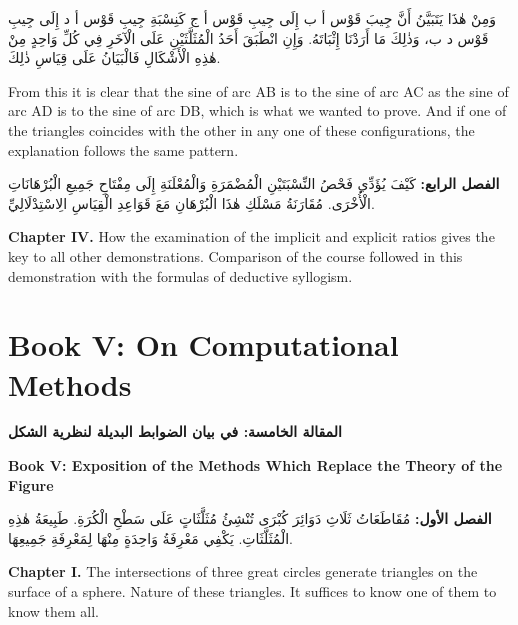\documentclass[11pt,a4paper]{article}
\theoremstyle{plain}
\theoremstyle{definition}
\theoremstyle{remark}
\newcommand{\ar}[1]{{\arabicfont\beginR #1\endR}}
\newcommand{\bilingualpair}[2]{%
  \par\noindent
  \begin{minipage}[t]{0.48\textwidth}
  #1
  \end{minipage}%
  \hfill
  \begin{minipage}[t]{0.48\textwidth}
  \vspace*{0pt}#2
  \end{minipage}\par\vspace{0.3cm}%
}
\begin{document}
\vspace{0.3cm}

\bilingualpair{\ar{وَمِنْ هٰذَا يَتَبَيَّنُ أَنَّ جِيبَ قَوْس أ ب إِلَى جِيبِ قَوْس أ ج كَنِسْبَةِ جِيبِ قَوْس أ د إِلَى جِيبِ قَوْس د ب، وَذٰلِكَ مَا أَرَدْنَا إِثْبَاتَهُ. وَإِنِ انْطَبَقَ أَحَدُ الْمُثَلَّثَيْنِ عَلَى الْآخَرِ فِي كُلِّ وَاحِدٍ مِنْ هٰذِهِ الْأَشْكَالِ فَالْبَيَانُ عَلَى قِيَاسِ ذٰلِكَ.}}{From this it is clear that the sine of arc AB is to the sine of arc AC as the sine of arc AD is to the sine of arc DB, which is what we wanted to prove. And if one of the triangles coincides with the other in any one of these configurations, the explanation follows the same pattern.}

\vspace{0.5cm}

\bilingualpair{\ar{\textbf{الفصل الرابع:} كَيْفَ يُؤَدِّي فَحْصُ النِّسْبَتَيْنِ الْمُضْمَرَةِ وَالْمُعْلَنَةِ إِلَى مِفْتَاحِ جَمِيعِ الْبُرْهَانَاتِ الْأُخْرَى. مُقَارَنَةُ مَسْلَكِ هٰذَا الْبُرْهَانِ مَعَ قَوَاعِدِ الْقِيَاسِ الِاسْتِدْلَالِيِّ.}}{\noindent\textbf{Chapter IV.} How the examination of the implicit and explicit ratios gives the key to all other demonstrations. Comparison of the course followed in this demonstration with the formulas of deductive syllogism.}

\clearpage


\section{Book V: On Computational Methods}
\label{sec:book5}

\bilingualpair{\noindent\textcolor{arabicblue}{\textbf{\ar{المقالة الخامسة: في بيان الضوابط البديلة لنظرية الشكل}}}}{\noindent\textcolor{sectioncolor}{\textbf{Book V: Exposition of the Methods Which Replace the Theory of the Figure}}}

\vspace{0.3cm}

\bilingualpair{\ar{\textbf{الفصل الأول:} مُقَاطَعَاتُ ثَلَاثِ دَوَائِرَ كُبْرَى تُنْشِئُ مُثَلَّثَاتٍ عَلَى سَطْحِ الْكُرَةِ. طَبِيعَةُ هٰذِهِ الْمُثَلَّثَاتِ. يَكْفِي مَعْرِفَةُ وَاحِدَةٍ مِنْهَا لِمَعْرِفَةِ جَمِيعِهَا.}}{\noindent\textbf{Chapter I.} The intersections of three great circles generate triangles on the surface of a sphere. Nature of these triangles. It suffices to know one of them to know them all.}
\end{document}
